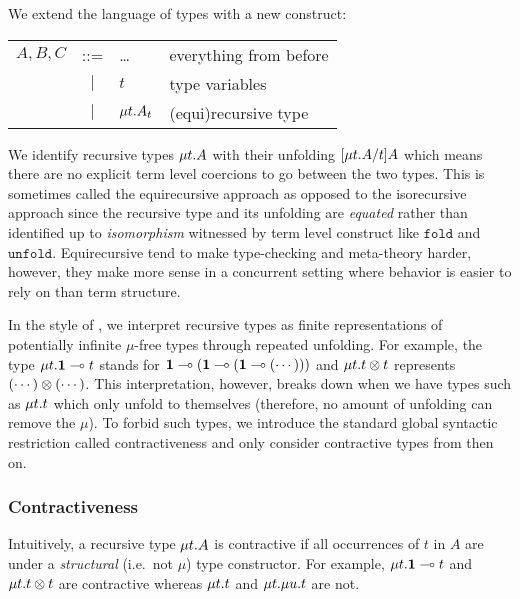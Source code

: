 \documentclass[a4paper,USenglish]{lipics-v2016}
\begin{document}

We extend the language of types with a new construct:
\begin{center}
\begin{tabular}{l c l l}
  $A, B, C$ & ::= & \ldots               & everything from before \\
            & $|$ & $t$                  & type variables \\
            & $|$ & $\mu{t} . {A_t}$ & (equi)recursive type
\end{tabular}
\end{center}

We identify recursive types $\mu{t} . {A}$ with their unfolding $\lbrack{\mu{t} . {A}}/{t}\rbrack{A}$ which means there are no explicit term level coercions to go between the two types. This is sometimes called the equirecursive approach as opposed to the isorecursive approach since the recursive type and its unfolding are \emph{equated} rather than identified up to \emph{isomorphism} witnessed by term level construct like  $\mathtt{fold}$ and $\mathtt{unfold}$. Equirecursive tend to make type-checking and meta-theory harder, however, they make more sense in a concurrent setting where behavior is easier to rely on than term structure. 

In the style of \cite{AmadioC91}, we interpret recursive types as finite representations of potentially infinite $\mu$-free types through repeated unfolding. For example, the type $\mu{t} . {\mathbf{1} \multimap t}$ stands for $\mathbf{1} \multimap (\mathbf{1} \multimap (\mathbf{1} \multimap (\cdots )))$ and $\mu{t} . {t \otimes t}$ represents $(\cdots) \otimes (\cdots)$. This interpretation, however, breaks down when we have types such as $\mu{t} . {t}$ which only unfold to themselves (therefore, no amount of unfolding can remove the $\mu$). To forbid such types, we introduce the standard global syntactic restriction called contractiveness and only consider contractive types from then on.


\subsubsection{Contractiveness}

Intuitively, a recursive type $\mu{t} . {A}$ is contractive if all occurrences of $t$ in $A$ are under a \emph{structural} (i.e.\ not $\mu$) type constructor. For example, $\mu{t} . {\mathbf{1} \multimap t}$ and $\mu{t} . {t \otimes t}$ are contractive whereas $\mu{t} . {t}$ and $\mu{t} . {\mu{u} . {t}}$ are not.
\end{document}
